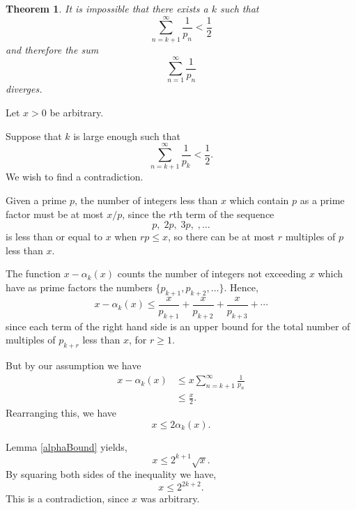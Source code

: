 \documentclass[10pt]{article}
\newtheorem{theorem}{Theorem}
\newenvironment{proof}[1][Proof]{\begin{trivlist}
\item[\hskip \labelsep {\bfseries #1}]}{\end{trivlist}}
\begin{document}
\begin{theorem}
    It is impossible that there exists a $k$
    such that
    \begin{equation*}
        \sum_{n=k+1}^\infty\frac{1}{p_n} < \frac{1}{2}
    \end{equation*}
    and therefore the sum
    \begin{equation*}
        \sum_{n=1}^\infty\frac{1}{p_n}
    \end{equation*}
    diverges.
\end{theorem}
\begin{proof}
    Let $x>0$ be arbitrary. 
    
    Suppose that $k$ is large enough such that
    \begin{equation*}
        \sum_{n=k+1}^\infty \frac{1}{p_k} <\frac{1}{2}.
    \end{equation*}
    We wish to find a contradiction.
    
    Given a prime $p$, the number of integers less than $x$ which contain
    $p$ as a prime factor must be at most $x/p$, since the $r$th term of the sequence
    \begin{equation*}
        p,\;2p,\;3p,\;,\ldots
    \end{equation*}
    is less than or equal to $x$ when $rp \leq x$, so there can be at most $r$
    multiples of $p$ less than $x$.
    
    The function $x-\alpha_k(x)$
    counts the number of integers not exceeding $x$
    which have as prime factors the numbers $\{p_{k+1},p_{k+2},\ldots\}$.
    Hence,
    \begin{equation*}
        x-\alpha_k(x) \leq \frac{x}{p_{k+1}}+\frac{x}{p_{k+2}}+\frac{x}{p_{k+3}}+\cdots
    \end{equation*}
    since each term of the right hand side is an upper bound for the total
    number of multiples of $p_{k+r}$ less than $x$, for $r\geq 1$.
    
    But by our assumption we have
    \begin{align*}
        x-\alpha_k(x) &\leq x\sum_{n=k+1}^\infty\frac{1}{p_n}\\
        &\leq \frac{x}{2}.
    \end{align*}
    Rearranging this, we have
    \begin{equation*}
        x\leq 2\alpha_k(x).
    \end{equation*}
    
    Lemma \ref{alphaBound} yields,
    \begin{equation*}
        x\leq 2^{k+1}\sqrt{x}.
    \end{equation*}
    By squaring both sides of the inequality we have,
    \begin{equation*}
        x\leq 2^{2k+2}.
    \end{equation*}
    This is a contradiction, since $x$ was arbitrary. 
    

\end{proof}
\end{document}
